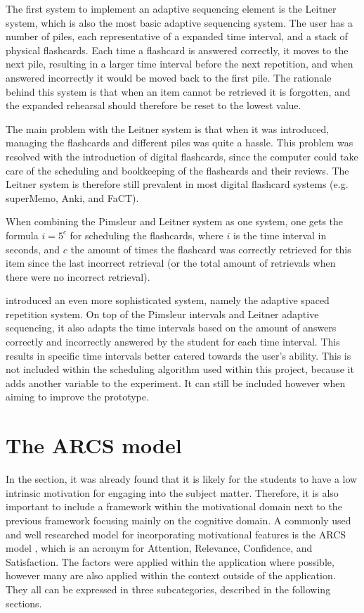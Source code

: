 The first system to implement an adaptive sequencing element is the Leitner system, which is also the most basic adaptive sequencing system. The user has a number of piles, each representative of a expanded time interval, and a stack of physical flashcards. Each time a flashcard is answered correctly, it moves to the next pile, resulting in a larger time interval before the next repetition, and when answered incorrectly it would be moved back to the first pile. The rationale behind this system is that when an item cannot be retrieved it is forgotten, and the expanded rehearsal should therefore be reset to the lowest value.

The main problem with the Leitner system is that when it was introduced, managing the flashcards and different piles was quite a hassle. This problem was resolved with the introduction of digital flashcards, since the computer could take care of the scheduling and bookkeeping of the flashcards and their reviews. The Leitner system is therefore still prevalent in most digital flashcard systems (e.g. superMemo, Anki, and FaCT).

When combining the Pimsleur and Leitner system as one system, one gets the formula $i = 5^c$ for scheduling the flashcards, where $i$ is the time interval in seconds, and $c$ the amount of times the flashcard was correctly retrieved for this item since the last incorrect retrieval (or the total amount of retrievals when there were no incorrect retrieval).

 introduced an even more sophisticated system, namely the adaptive spaced repetition system. On top of the Pimsleur intervals and Leitner adaptive sequencing, it also adapts the time intervals based on the amount of answers correctly and incorrectly answered by the student for each time interval. This results in specific time intervals better catered towards the user's ability. This is not included within the scheduling algorithm used within this project, because it adds another variable to the experiment. It can still be included however when aiming to improve the prototype.

    \section{The ARCS model}

In the  section, it was already found that it is likely for the students to have a low intrinsic motivation for engaging into the subject matter. Therefore, it is also important to include a framework within the motivational domain next to the previous framework focusing mainly on the cognitive domain. A commonly used and well researched model for incorporating motivational features is the ARCS model \cite{arcs}, which is an acronym for Attention, Relevance, Confidence, and Satisfaction. The factors were applied within the application where possible, however many are also applied within the context outside of the application. They all can be expressed in three subcategories, described in the following sections.

